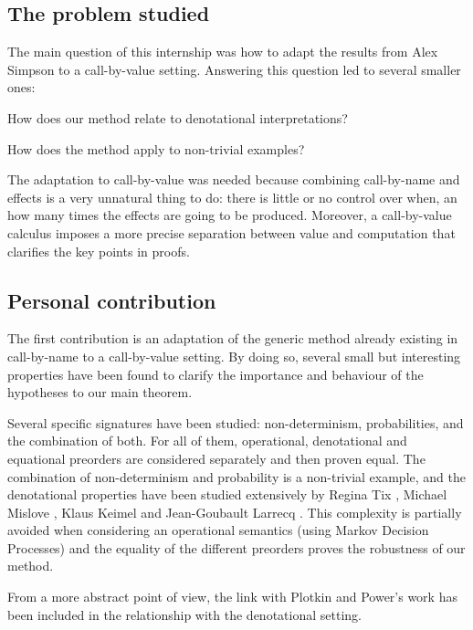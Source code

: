 \documentclass{article}
\newenvironment{point}[1]%
{\subsection*{#1}}%
{}
\begin{document}
\begin{point}{The problem studied}

    The main question of this internship was
    how to adapt the results from Alex Simpson \cite{gom} 
    to a call-by-value setting. 
    Answering this question led to several smaller ones:
    \begin{inparaenum}[(a)]
        \item How does our method relate to denotational interpretations? 
        \item How does the method apply  to non-trivial examples?
    \end{inparaenum}

    The adaptation to call-by-value was needed because 
    combining call-by-name and effects is a very 
    unnatural thing to do: there is little or 
    no control over when, an how many times 
    the effects are going to be produced. Moreover,
    a call-by-value calculus imposes a more precise 
    separation between value and computation that 
    clarifies the key points in proofs. 

\end{point}

\begin{point}{Personal contribution}

    The first contribution is an adaptation of 
    the generic method already existing in call-by-name 
    \cite{gom} to a call-by-value setting. By doing 
    so, several small but interesting properties have 
    been found to clarify the importance and 
    behaviour of the hypotheses to our main theorem.

    Several specific signatures have been studied: non-determinism,
    probabilities, and the combination of both. For all of them, 
    operational, denotational and equational preorders 
    are considered separately and then proven equal. 
    The combination of non-determinism and probability is 
    a non-trivial example, and the denotational properties 
    have been studied extensively by Regina Tix \cite{tix2009semantic},
    Michael Mislove \cite{mislove2004axioms}, Klaus Keimel  \cite{KeimelP2016}
    and Jean-Goubault Larrecq \cite{JGL-mscs16}. This complexity 
    is partially avoided when considering an operational semantics 
    (using Markov Decision Processes) 
    and the equality of the different preorders proves the robustness of 
    our method.

    From a more abstract point of view, the link 
    with Plotkin and Power's work \cite{plotkin2001adequacy} 
    has been included in the relationship with the denotational setting.
\end{point}
\end{document}
